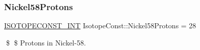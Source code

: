 \subsubsection{\texorpdfstring{Nickel58\+Protons}{Nickel58Protons}}
{\footnotesize\ttfamily \mbox{\hyperlink{group___isotope_const-_macros_ga5f18360b3e99483a35c32d789e62621c}{I\+S\+O\+T\+O\+P\+E\+C\+O\+N\+S\+T\+\_\+\+I\+NT}} Isotope\+Const\+::\+Nickel58\+Protons = 28}

\$ \$ Protons in Nickel-\/58. 